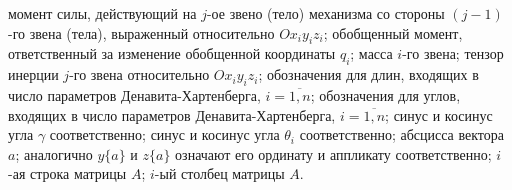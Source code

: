 \begin{itemize}
 момент силы, действующий на $j$-ое звено (тело) механизма со стороны ${(j-1)}$-го звена (тела), выраженный относительно $Ox_{i}y_{i}z_{i}$;
 обобщенный момент, ответственный за изменение обобщенной координаты $q_i$;
 масса $i$-го звена;
 тензор инерции $j$-го звена относительно $Ox_{i}y_{i}z_{i}$;
 обозначения для длин, входящих в число параметров Де\-на\-ви\-та-Хар\-тен\-бер\-га, $i=\overline{1,n}$;
 обозначения для углов, входящих в число параметров Де\-на\-ви\-та-Хар\-тен\-бер\-га, $i=\overline{1,n}$;
 синус и косинус угла $\gamma$ соответственно;
 синус и косинус угла $\theta_i$ соответственно;
 абсцисса вектора $a$; аналогично $y\{a\}$ и $z\{a\}$ означают его ординату и аппликату соответственно;
 $i$-ая строка матрицы $A$;
 $i$-ый столбец матрицы $A$.
\end{itemize}
\newpage
